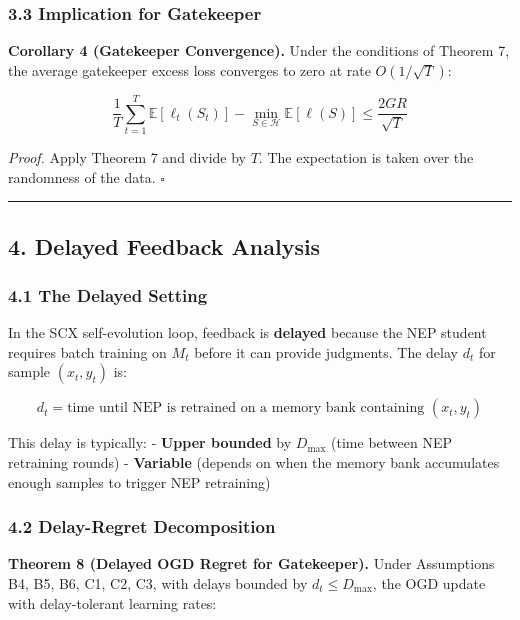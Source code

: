 \documentclass[
  12pt,
]{ctexart}
\begin{document}
\subsubsection{3.3 Implication for
Gatekeeper}\label{implication-for-gatekeeper}

\textbf{Corollary 4 (Gatekeeper Convergence).} Under the conditions of
Theorem 7, the average gatekeeper excess loss converges to zero at rate
\(O(1/\sqrt{T})\):

\[\frac{1}{T} \sum_{t=1}^T \mathbb{E}[\ell_t(S_t)] - \min_{S \in \mathcal{H}} \mathbb{E}[\ell(S)] \leq \frac{2GR}{\sqrt{T}}\]

\emph{Proof.} Apply Theorem 7 and divide by \(T\). The expectation is
taken over the randomness of the data. \(\square\)

\begin{center}\rule{0.5\linewidth}{0.5pt}\end{center}

\subsection{4. Delayed Feedback
Analysis}\label{delayed-feedback-analysis}

\subsubsection{4.1 The Delayed Setting}\label{the-delayed-setting}

In the SCX self-evolution loop, feedback is \textbf{delayed} because the
NEP student requires batch training on \(M_t\) before it can provide
judgments. The delay \(d_t\) for sample \((x_t, y_t)\) is:

\[d_t = \text{time until NEP is retrained on a memory bank containing } (x_t, y_t)\]

This delay is typically: - \textbf{Upper bounded} by \(D_{\max}\) (time
between NEP retraining rounds) - \textbf{Variable} (depends on when the
memory bank accumulates enough samples to trigger NEP retraining)

\subsubsection{4.2 Delay-Regret
Decomposition}\label{delay-regret-decomposition}

\textbf{Theorem 8 (Delayed OGD Regret for Gatekeeper).} Under
Assumptions B4, B5, B6, C1, C2, C3, with delays bounded by
\(d_t \leq D_{\max}\), the OGD update with delay-tolerant learning
rates:
\end{document}
